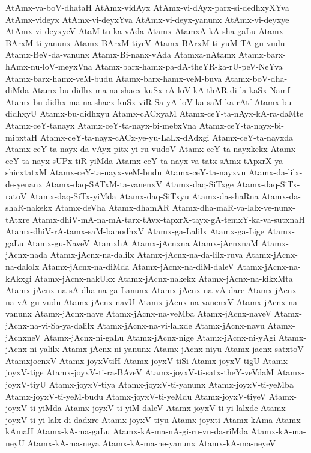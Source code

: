 {AtAmx-va-boV-dhataH
AtAmx-vidAyx
AtAmx-vi-dAyx-parx-si-dedhxyXYva
AtAmx-videyx
AtAmx-vi-deyxYva
AtAmx-vi-deyx-yanunx
AtAmx-vi-deyxye
AtAmx-vi-deyxyeV
AtaM-tu-ka-vAda
Atamx
AtamxA-kA-sha-gaLu
Atamx-BArxM-ti-yanunx
Atamx-BArxM-tiyeV
Atamx-BArxM-ti-yuM-TA-gu-vudu
Atamx-BeV-da-vanunx
Atamx-Bi-nanx-vAda
Atamxa-nAtamx
Atamx-barx-hAmx-nu-loV-meyxVna
Atamx-barx-hamx-pa-dA-theYR-ka-rU-peV-NeYva
Atamx-barx-hamx-veM-budu
Atamx-barx-hamx-veM-buva
Atamx-boV-dha-diMda
Atamx-bu-didhx-ma-na-shacx-kuSx-rA-loV-kA-thAR-di-la-kaSx-Namf
Atamx-bu-didhx-ma-na-shacx-kuSx-viR-Sa-yA-loV-ka-saM-ka-rAtf
Atamx-bu-didhxyU
Atamx-bu-didhxyu
Atamx-cACxyaM
Atamx-ceY-ta-nAyx-kA-ra-daMte
Atamx-ceY-tanayx
Atamx-ceY-ta-nayx-bi-mebxVna
Atamx-ceY-ta-nayx-bi-mibxtaH
Atamx-ceY-ta-nayx-cACx-ye-yu-LaLx-dAdxgi
Atamx-ceY-ta-nayxda
Atamx-ceY-ta-nayx-da-vAyx-pitx-yi-ru-vudoV
Atamx-ceY-ta-nayxkekx
Atamx-ceY-ta-nayx-sUPx-tiR-yiMda
Atamx-ceY-ta-nayx-va-tatx-sAmx-tApxrX-ya-shicxtatxM
Atamx-ceY-ta-nayx-veM-budu
Atamx-ceY-ta-nayxvu
Atamx-da-lilx-de-yenanx
Atamx-daq-SATxM-ta-vanenxV
Atamx-daq-SiTxge
Atamx-daq-SiTx-ratoV
Atamx-daq-SiTx-yiMda
Atamx-daq-SiTxyu
Atamx-da-shaRna
Atamx-da-shaR-nakekx
Atamx-deVha
Atamx-dhamAR
Atamx-dha-maR-va-lalx-ve-nunx-tAtxre
Atamx-dhiV-mA-na-mA-tarx-tAvx-tapxrX-tayx-gA-temxY-ka-va-sutxnaH
Atamx-dhiV-rA-tamx-saM-banodhxV
Atamx-ga-Lalilx
Atamx-ga-Lige
Atamx-gaLu
Atamx-gu-NaveV
AtamxhA
Atamx-jAcnxna
Atamx-jAcnxnaM
Atamx-jAcnx-nada
Atamx-jAcnx-na-dalilx
Atamx-jAcnx-na-da-lilx-ruva
Atamx-jAcnx-na-dalolx
Atamx-jAcnx-na-diMda
Atamx-jAcnx-na-diM-daleV
Atamx-jAcnx-na-kAkxgi
Atamx-jAcnx-nakUkx
Atamx-jAcnx-nakekx
Atamx-jAcnx-na-kikxMta
Atamx-jAcnx-na-sA-dha-na-ga-Lanunx
Atamx-jAcnx-na-vA-dare
Atamx-jAcnx-na-vA-gu-vudu
Atamx-jAcnx-navU
Atamx-jAcnx-na-vanenxV
Atamx-jAcnx-na-vanunx
Atamx-jAcnx-nave
Atamx-jAcnx-na-veMba
Atamx-jAcnx-naveV
Atamx-jAcnx-na-vi-Sa-ya-dalilx
Atamx-jAcnx-na-vi-lalxde
Atamx-jAcnx-navu
Atamx-jAcnxneV
Atamx-jAcnx-ni-gaLu
Atamx-jAcnx-nige
Atamx-jAcnx-ni-yAgi
Atamx-jAcnx-ni-yalilx
Atamx-jAcnx-ni-yanunx
Atamx-jAcnx-niyu
Atamx-jacnx-satxtoV
AtamxjocnxV
Atamx-joyxVtiH
Atamx-joyxV-tiSi
Atamx-joyxV-tigU
Atamx-joyxV-tige
Atamx-joyxV-ti-ra-BAveV
Atamx-joyxV-ti-satx-theY-veVdaM
Atamx-joyxV-tiyU
Atamx-joyxV-tiya
Atamx-joyxV-ti-yanunx
Atamx-joyxV-ti-yeMba
Atamx-joyxV-ti-yeM-budu
Atamx-joyxV-ti-yeMdu
Atamx-joyxV-tiyeV
Atamx-joyxV-ti-yiMda
Atamx-joyxV-ti-yiM-daleV
Atamx-joyxV-ti-yi-lalxde
Atamx-joyxV-ti-yi-lalx-di-dadxre
Atamx-joyxV-tiyu
Atamx-joyxti
Atamx-kAma
Atamx-kAmaH
Atamx-kA-ma-gaLu
Atamx-kA-ma-nA-gi-ru-vu-da-riMda
Atamx-kA-ma-neyU
Atamx-kA-ma-neya
Atamx-kA-ma-ne-yanunx
Atamx-kA-ma-neyeV
}

